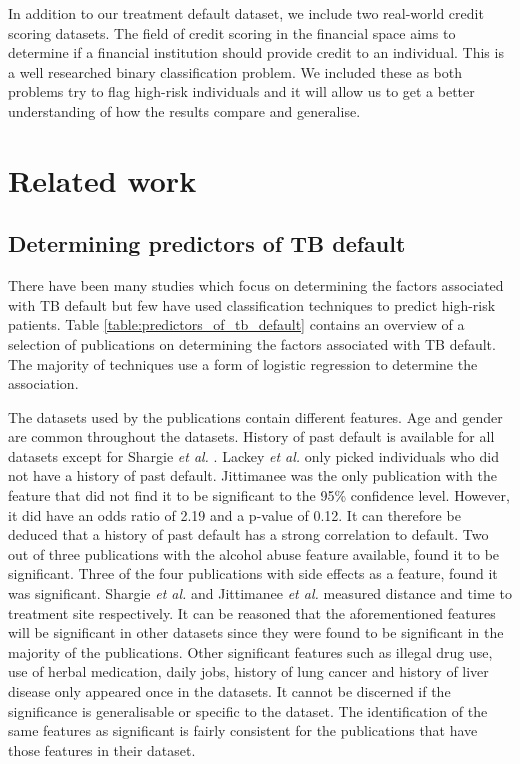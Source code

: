 \documentclass{sig-alternate-05-2015}
\begin{document}
	In addition to our treatment default dataset, we include two real-world credit scoring datasets. The field of credit scoring in the financial space aims to determine if a financial institution should provide credit to an individual. This is a well researched binary classification problem. We included these as both problems try to flag high-risk individuals and it will allow us to get a better understanding of how the results compare and generalise.
	
	\section{Related work}
	\subsection{Determining predictors of TB default}
	\label{predictors_of_defaulters_related_work}
	There have been many studies which focus on determining the factors associated with TB default but few have used classification techniques to predict high-risk patients. Table \ref{table:predictors_of_tb_default} contains an overview of a selection of publications on determining the factors associated with TB default. The majority of techniques use a form of logistic regression to determine the association. 
	
	The datasets used by the publications contain different features. Age and gender are common throughout the datasets. History of past default is available for all datasets except for Shargie \textit{et al.} \cite{Shargie:10.1371/journal.pmed.0040037}. Lackey \textit{et al.} \cite{Lackey:10356751520150601} only picked individuals who did not have a history of past default. Jittimanee \cite{jittimanee:10.1111/j.1440-172X.2007.00650.x} was the only publication with the feature that did not find it to be significant to the 95\% confidence level. However, it did have an odds ratio of 2.19 and a p-value of 0.12. It can therefore be deduced that a history of past default has a strong correlation to default. Two out of three publications with the alcohol abuse feature available, found it to be significant. Three of the four publications with side effects as a feature, found it was significant. Shargie \textit{et al.} \cite{Shargie:10.1371/journal.pmed.0040037} and Jittimanee \textit{et al.} \cite{jittimanee:10.1111/j.1440-172X.2007.00650.x} measured distance and time to treatment site respectively. It can be reasoned that the aforementioned features will be significant in other datasets since they were found to be significant in the majority of the publications. Other significant features such as illegal drug use, use of herbal medication, daily jobs, history of lung cancer and history of liver disease only appeared once in the datasets. It cannot be discerned if the significance is generalisable or specific to the dataset. The identification of the same features as significant is fairly consistent for the publications that have those features in their dataset. 
\end{document}
